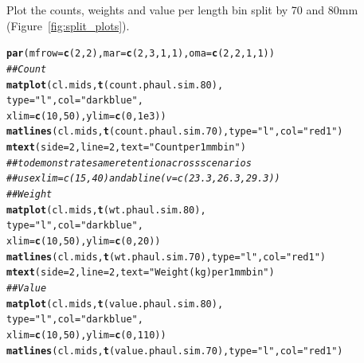 \documentclass[12pt]{article}\usepackage[]{graphicx}\usepackage[]{color}
\makeatletter
\newcommand{\hlnum}[1]{\textcolor[rgb]{0.686,0.059,0.569}{#1}}%
\newcommand{\hlstr}[1]{\textcolor[rgb]{0.192,0.494,0.8}{#1}}%
\newcommand{\hlcom}[1]{\textcolor[rgb]{0.678,0.584,0.686}{\textit{#1}}}%
\newcommand{\hlstd}[1]{\textcolor[rgb]{0.345,0.345,0.345}{#1}}%
\newcommand{\hlkwc}[1]{\textcolor[rgb]{0.333,0.667,0.333}{#1}}%
\newcommand{\hlkwd}[1]{\textcolor[rgb]{0.737,0.353,0.396}{\textbf{#1}}}%
\newenvironment{kframe}{%
 \def\at@end@of@kframe{}%
 \ifinner\ifhmode%
  \def\at@end@of@kframe{\end{minipage}}%
  \begin{minipage}{\columnwidth}%
 \fi\fi%
 \def\FrameCommand##1{\hskip\@totalleftmargin \hskip-\fboxsep
 \colorbox{shadecolor}{##1}\hskip-\fboxsep
     \hskip-\linewidth \hskip-\@totalleftmargin \hskip\columnwidth}%
 \MakeFramed {\advance\hsize-\width
   \@totalleftmargin\z@ \linewidth\hsize
   \@setminipage}}%
 {\par\unskip\endMakeFramed%
 \at@end@of@kframe}
\newenvironment{knitrout}{}{} %
\makeatother
\begin{document}
Plot the counts, weights and value per length bin split by 70 and 80mm (Figure~\ref{fig:split_plots}).

\begin{knitrout}\footnotesize
{}\color{fgcolor}\begin{kframe}
\begin{alltt}
\hlkwd{par}\hlstd{(}\hlkwc{mfrow} \hlstd{=} \hlkwd{c}\hlstd{(}\hlnum{2}\hlstd{,} \hlnum{2}\hlstd{),} \hlkwc{mar} \hlstd{=} \hlkwd{c}\hlstd{(}\hlnum{2}\hlstd{,} \hlnum{3}\hlstd{,} \hlnum{1}\hlstd{,} \hlnum{1}\hlstd{),} \hlkwc{oma} \hlstd{=} \hlkwd{c}\hlstd{(}\hlnum{2}\hlstd{,} \hlnum{2}\hlstd{,} \hlnum{1}\hlstd{,} \hlnum{1}\hlstd{))}
\hlcom{## Count}
\hlkwd{matplot}\hlstd{(cl.mids,} \hlkwd{t}\hlstd{(count.phaul.sim.80),}
        \hlkwc{type} \hlstd{=} \hlstr{"l"}\hlstd{,} \hlkwc{col} \hlstd{=} \hlstr{"darkblue"}\hlstd{,}
        \hlkwc{xlim} \hlstd{=} \hlkwd{c}\hlstd{(}\hlnum{10}\hlstd{,} \hlnum{50}\hlstd{),} \hlkwc{ylim} \hlstd{=} \hlkwd{c}\hlstd{(}\hlnum{0}\hlstd{,} \hlnum{1e3}\hlstd{))}
\hlkwd{matlines}\hlstd{(cl.mids,} \hlkwd{t}\hlstd{(count.phaul.sim.70),} \hlkwc{type} \hlstd{=} \hlstr{"l"}\hlstd{,} \hlkwc{col} \hlstd{=} \hlstr{"red1"}\hlstd{)}
\hlkwd{mtext}\hlstd{(}\hlkwc{side} \hlstd{=} \hlnum{2}\hlstd{,} \hlkwc{line} \hlstd{=} \hlnum{2}\hlstd{,} \hlkwc{text} \hlstd{=} \hlstr{"Count per 1mm bin"}\hlstd{)}
\hlcom{## to demonstrate same retention across scenarios}
\hlcom{## use xlim = c(15, 40) and abline(v = c(23.3, 26.3, 29.3))}
\hlcom{## Weight}
\hlkwd{matplot}\hlstd{(cl.mids,} \hlkwd{t}\hlstd{(wt.phaul.sim.80),}
        \hlkwc{type} \hlstd{=} \hlstr{"l"}\hlstd{,} \hlkwc{col} \hlstd{=} \hlstr{"darkblue"}\hlstd{,}
        \hlkwc{xlim} \hlstd{=} \hlkwd{c}\hlstd{(}\hlnum{10}\hlstd{,} \hlnum{50}\hlstd{),} \hlkwc{ylim} \hlstd{=} \hlkwd{c}\hlstd{(}\hlnum{0}\hlstd{,} \hlnum{20}\hlstd{))}
\hlkwd{matlines}\hlstd{(cl.mids,} \hlkwd{t}\hlstd{(wt.phaul.sim.70),} \hlkwc{type} \hlstd{=} \hlstr{"l"}\hlstd{,} \hlkwc{col} \hlstd{=} \hlstr{"red1"}\hlstd{)}
\hlkwd{mtext}\hlstd{(}\hlkwc{side} \hlstd{=} \hlnum{2}\hlstd{,} \hlkwc{line} \hlstd{=} \hlnum{2}\hlstd{,} \hlkwc{text} \hlstd{=} \hlstr{"Weight (kg) per 1mm bin"}\hlstd{)}
\hlcom{## Value}
\hlkwd{matplot}\hlstd{(cl.mids,} \hlkwd{t}\hlstd{(value.phaul.sim.80),}
        \hlkwc{type} \hlstd{=} \hlstr{"l"}\hlstd{,} \hlkwc{col} \hlstd{=} \hlstr{"darkblue"}\hlstd{,}
        \hlkwc{xlim} \hlstd{=} \hlkwd{c}\hlstd{(}\hlnum{10}\hlstd{,} \hlnum{50}\hlstd{),} \hlkwc{ylim} \hlstd{=} \hlkwd{c}\hlstd{(}\hlnum{0}\hlstd{,} \hlnum{110}\hlstd{))}
\hlkwd{matlines}\hlstd{(cl.mids,} \hlkwd{t}\hlstd{(value.phaul.sim.70),} \hlkwc{type} \hlstd{=} \hlstr{"l"}\hlstd{,} \hlkwc{col} \hlstd{=} \hlstr{"red1"}\hlstd{)}

\end{alltt}
\end{kframe}
\end{knitrout}
\end{document}
